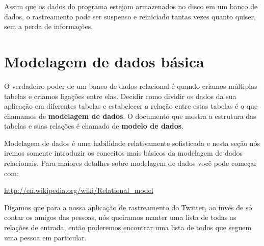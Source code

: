 Assim que os dados do programa estejam armazenados no disco em um banco de
dados, o rastreamento pode ser suspenso e reiniciado tantas vezes quanto
quiser, sem a perda de informações.

\section{Modelagem de dados básica}


O verdadeiro poder de um banco de dados relacional é quando criamos múltiplas
tabelas e criamos ligações entre elas. Decidir como dividir os dados da sua
aplicação em diferentes tabelas e estabelecer a relação entre estas tabelas é
o que chamamos de {\bf modelagem de dados}. O documento que mostra a estrutura 
das tabelas e suas relações é chamado de {\bf modelo de dados}.


Modelagem de dados é uma habilidade relativamente sofisticada e nesta seção
nós iremos somente introduzir os conceitos mais básicos da modelagem de dados
relacionais. Para maiores detalhes sobre modelagem de dados você pode começar
com:

\url{http://en.wikipedia.org/wiki/Relational_model}


Digamos que para a nossa aplicação de rastreamento do Twitter, ao invés de
só contar os amigos das pessoas, nós queiramos manter uma lista de todas as
relações de entrada, então poderemos encontrar uma lista de todos que seguem
uma pessoa em particular.


